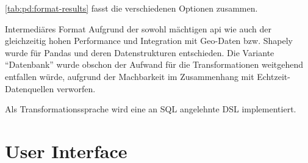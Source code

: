 \cref{tab:pd:format-results} fasst die verschiedenen Optionen zusammen.

\begin{decision}[label=dec:pd:format]{Intermediäres Format}
Aufgrund der sowohl mächtigen \acs{api} wie auch der gleichzeitig hohen Performance und Integration mit Geo-Daten bzw. Shapely wurde für Pandas und deren Datenstrukturen entschieden. Die Variante ``Datenbank'' wurde obschon der Aufwand für die Transformationen weitgehend entfallen würde, aufgrund der Machbarkeit im Zusammenhang mit Echtzeit-Datenquellen verworfen.

Als Transformationssprache wird eine an SQL angelehnte DSL implementiert.
\end{decision}

\section{User Interface}
